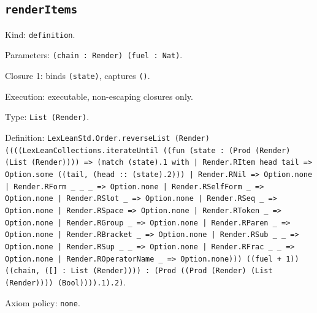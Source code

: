 \documentclass[11pt]{article}
\begin{document}
\subsection*{\texttt{renderItems}}
\noindent Kind: \texttt{definition}.\par
\noindent Parameters: \texttt{(chain : Render) (fuel : Nat)}.\par
\noindent Closure 1: binds \texttt{(state)}, captures \texttt{()}.\par
\noindent Execution: executable, non-escaping closures only.\par
\noindent Type: \texttt{List (Render)}.\par
\noindent Definition: \texttt{LexLeanStd.Order.reverseList (Render) ((((LexLeanCollections.iterateUntil ((fun (state : (Prod (Render) (List (Render)))) => (match (state).1 with | Render.RItem head tail => Option.some ((tail, (head :: (state).2))) | Render.RNil => Option.none | Render.RForm \_ \_ \_ => Option.none | Render.RSelfForm \_ => Option.none | Render.RSlot \_ => Option.none | Render.RSeq \_ => Option.none | Render.RSpace => Option.none | Render.RToken \_ => Option.none | Render.RGroup \_ => Option.none | Render.RParen \_ => Option.none | Render.RBracket \_ => Option.none | Render.RSub \_ \_ => Option.none | Render.RSup \_ \_ => Option.none | Render.RFrac \_ \_ => Option.none | Render.ROperatorName \_ => Option.none))) ((fuel + 1)) ((chain, ([] : List (Render)))) : (Prod ((Prod (Render) (List (Render)))) (Bool)))).1).2)}.\par
\noindent Axiom policy: \texttt{none}.\par
\end{document}
